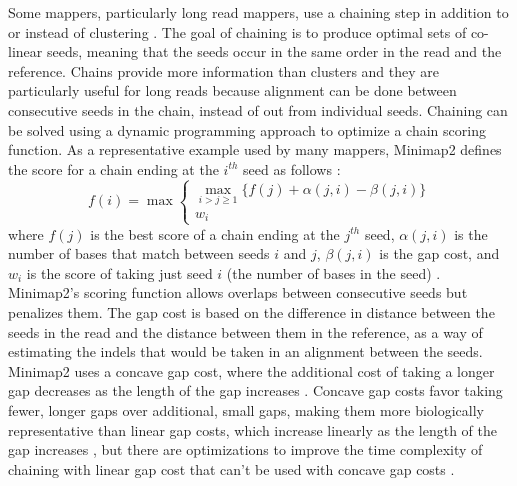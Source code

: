 \documentclass[11pt]{ucscthesis}
\begin{document}
Some mappers, particularly long read mappers, use a chaining step in addition to or instead of clustering \cite{sahlin_survey_2023}.
The goal of chaining is to produce optimal sets of co-linear seeds, meaning that the seeds occur in the same order in the read and the reference.
Chains provide more information than clusters and they are particularly useful for long reads because alignment can be done between consecutive seeds in the chain, instead of out from individual seeds.
Chaining can be solved using a dynamic programming approach to optimize a chain scoring function.
As a representative example used by many mappers, Minimap2 defines the score for a chain ending at the $i^{th}$ seed as follows \cite{minimap2_2021}:
\begin{equation}
    f(i) = \max\begin{cases}
                \max_{i>j\geq 1} \{f(j) + \alpha(j,i) - \beta(j,i)\}\\
                w_i
                \end{cases}
\end{equation}
where $f(j)$ is the best score of a chain ending at the $j^{th}$ seed, $\alpha(j,i)$ is the number of bases that match between seeds $i$ and $j$, $\beta(j,i)$ is the gap cost, and $w_i$ is the score of taking just seed $i$ (the number of bases in the seed) \cite{minimap2_2021}.
Minimap2's scoring function allows overlaps between consecutive seeds but penalizes them. 
The gap cost is based on the difference in distance between the seeds in the read and the distance between them in the reference, as a way of estimating the indels that would be taken in an alignment between the seeds.
Minimap2 uses a concave gap cost, where the additional cost of taking a longer gap decreases as the length of the gap increases \cite{sahlin_survey_2023}.
Concave gap costs favor taking fewer, longer gaps over additional, small gaps, making them more biologically representative than linear gap costs, which increase linearly as the length of the gap increases \cite{sahlin_survey_2023}, but there are optimizations to improve the time complexity of chaining with linear gap cost that can't be used with concave gap costs \cite{abouelhoda_linear_chaining_2005}.


\end{document}
